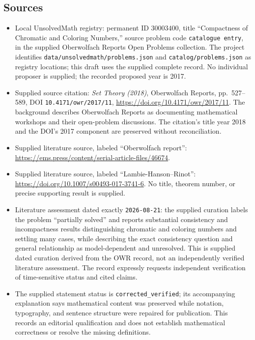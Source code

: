 \documentclass[11pt]{article}
\begin{document}
\subsection{Sources}
\begin{itemize}
\item Local UnsolvedMath registry: permanent ID \(30003400\), title ``Compactness of Chromatic and Coloring Numbers,'' source problem code \texttt{catalogue entry}, in the supplied Oberwolfach Reports Open Problems collection. The project identifies \texttt{data/unsolvedmath/problems.json} and \texttt{catalog/problems.json} as registry locations; this draft uses the supplied complete record. No individual proposer is supplied; the recorded proposed year is 2017.
\item Supplied source citation: \emph{Set Theory (2018)}, Oberwolfach Reports, pp.\ 527--589, DOI \texttt{10.4171/owr/2017/11}, \url{https://doi.org/10.4171/owr/2017/11}. The background describes Oberwolfach Reports as documenting mathematical workshops and their open-problem discussions. The citation's title year 2018 and the DOI's 2017 component are preserved without reconciliation.
\item Supplied literature source, labeled ``Oberwolfach report'': \url{https://ems.press/content/serial-article-files/46674}.
\item Supplied literature source, labeled ``Lambie-Hanson--Rinot'': \url{https://doi.org/10.1007/s00493-017-3741-6}. No title, theorem number, or precise supporting result is supplied.
\item Literature assessment dated exactly \texttt{2026-08-21}: the supplied curation labels the problem ``partially solved'' and reports substantial consistency and incompactness results distinguishing chromatic and coloring numbers and settling many cases, while describing the exact consistency question and general relationship as model-dependent and unresolved. This is supplied dated curation derived from the OWR record, not an independently verified literature assessment. The record expressly requests independent verification of time-sensitive status and cited claims.
\item The supplied statement status is \texttt{corrected\_verified}; its accompanying explanation says mathematical content was preserved while notation, typography, and sentence structure were repaired for publication. This records an editorial qualification and does not establish mathematical correctness or resolve the missing definitions.
\end{itemize}
\end{document}
